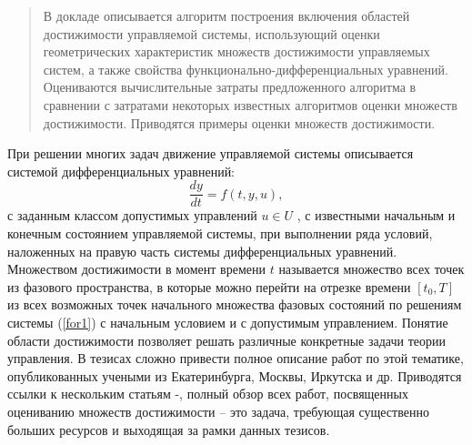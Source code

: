 
\maketitle

\begin{abstract}
В докладе описывается алгоритм построения включения областей достижимости управляемой системы, использующий оценки геометрических характеристик множеств достижимости управляемых систем, а также свойства функционально-дифференциальных уравнений. Оцениваются вычислительные затраты предложенного алгоритма в сравнении с затратами некоторых известных алгоритмов оценки множеств достижимости.  Приводятся примеры оценки множеств достижимости.

\end{abstract}


При решении многих задач движение  управляемой системы описывается  системой дифференциальных уравнений:
\begin{equation}\frac{dy}{dt} = f (t, y, u) ,
\label{for1}
\end{equation}
с заданным классом допустимых управлений $u \in U$ , с известными начальным и конечным состоянием управляемой системы, при выполнении ряда условий, наложенных на правую часть системы дифференциальных уравнений.
Множеством достижимости в момент времени  $t$ называется множество всех точек из фазового пространства, в которые можно перейти на отрезке времени $[t_{0},T ]$   из всех возможных точек начального множества фазовых состояний  по решениям системы (\ref{for1}) с начальным условием   и с допустимым управлением.
Понятие  области достижимости позволяет решать различные конкретные задачи теории управления.
 В тезисах сложно привести полное описание работ  по этой тематике, опубликованных учеными из Екатеринбурга, Москвы, Иркутска и др. Приводятся ссылки к нескольким статьям \cite{Kurzhansky}-\cite{Gornov},
 полный обзор всех работ, посвященных оцениванию множеств достижимости -- это задача, требующая существенно больших ресурсов и выходящая за рамки данных тезисов.

